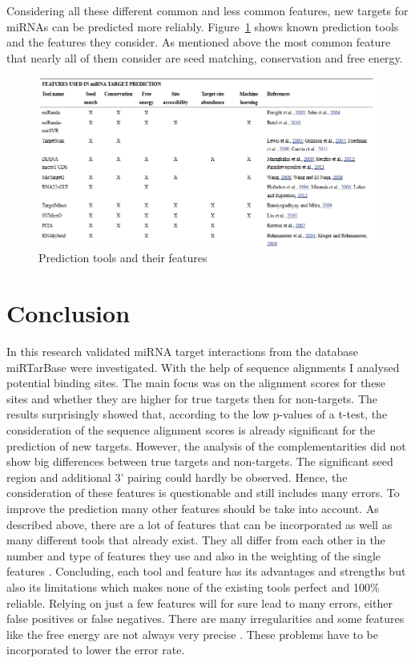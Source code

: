 \documentclass[11pt, a4paper, twoside]{book}
\begin{document}
   
Considering all these different common and less common features, new targets for miRNAs can be predicted more reliably. Figure~\ref{fig:tools} shows known prediction tools and the features they consider. As mentioned above the most common feature that nearly all of them consider are seed matching, conservation and free energy. \\


\begin{figure}
\centering
\includegraphics[width=\textwidth]{results/tools.PNG}
\caption{Prediction tools and their features}
\label{fig:tools}
\end{figure}


\vspace{2cm}



\chapter{Conclusion}
\label{chapter:conlusion}

In this research validated miRNA target interactions from the database miRTarBase were investigated. With the help of sequence alignments I analysed potential binding sites. The main focus was on the alignment scores for these sites and whether they are higher for true targets then for non-targets. The results surprisingly showed that, according to the low p-values of a t-test, the consideration of the sequence alignment scores is already significant for the prediction of new targets. However, the analysis of the complementarities did not show big differences between true targets and non-targets. The significant seed region and additional 3' pairing could hardly be observed. Hence, the consideration of these features is questionable and still includes many errors. To improve the prediction many other features should be take into account.
As described above, there are a lot of features that can be incorporated as well as many different tools that already exist. They all differ from each other in the number and type of features they use and also in the weighting of the single features \cite{Peterson}. Concluding, each tool and feature has its advantages and strengths but also its limitations which makes none of the existing tools perfect and 100\% reliable. Relying on just a few features will for sure lead to many errors, either false positives or false negatives. There are many irregularities and some features like the free energy are not always very precise \cite{Peterson}. These problems have to be incorporated to lower the error rate.\\
\end{document}
